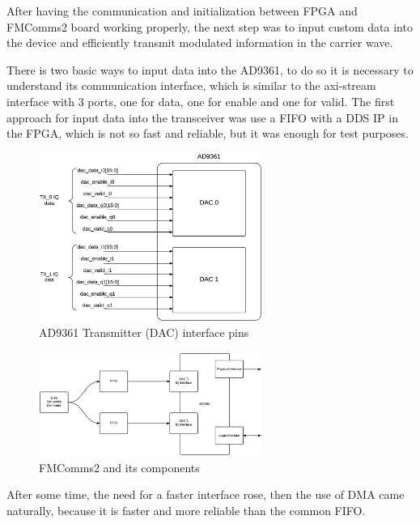 After having the communication and initialization between FPGA and FMComms2
board working properly, the next step was to input custom data into the device
and efficiently transmit modulated information in the carrier wave.

There is two basic ways to input data into the AD9361, to do so it is necessary to understand
its communication interface, which is similar to the axi-stream interface with
3 ports, one for data, one for enable and one for valid. The first approach for
input data into the transceiver was use a FIFO with a DDS IP in the FPGA, which
is not so fast and reliable, but it was enough for test purposes.

\begin{figure}[htbp]
    \centering
    \includegraphics[width=0.65\textwidth]{./figures/ad9361tx_pins}
    \caption{ AD9361 Transmitter (DAC) interface pins
    \label{fig:txpins}}
\end{figure}


\begin{figure}[htbp]
    \centering
    \includegraphics[width=0.65\textwidth]{./figures/dac_fifo}
    \caption{ FMComms2 and its components
    \label{fig:fmcomm}}
\end{figure}

After some time, the need for a faster interface rose, then the use of DMA came
naturally, because it is faster and more reliable than the common FIFO.


